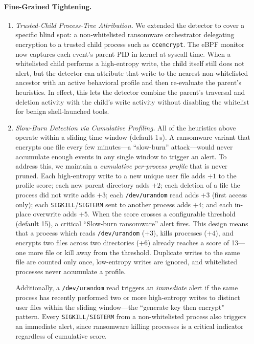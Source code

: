 \documentclass[twocolumn, 10pt]{scrartcl}
\begin{document}
\paragraph{Fine-Grained Tightening.}
\begin{enumerate}
    \item \textit{Trusted-Child Process-Tree Attribution.}
    We extended the detector to cover a specific blind spot: a non-whitelisted ransomware orchestrator delegating encryption to a trusted child process such as \texttt{ccencrypt}. The eBPF monitor now captures each event's parent PID in-kernel at syscall time. When a whitelisted child performs a high-entropy write, the child itself still does not alert, but the detector can attribute that write to the nearest non-whitelisted ancestor with an active behavioral profile and then re-evaluate the parent's heuristics. In effect, this lets the detector combine the parent's traversal and deletion activity with the child's write activity without disabling the whitelist for benign shell-launched tools.

    \item \textit{Slow-Burn Detection via Cumulative Profiling.}
    All of the heuristics above operate within a sliding time window (default 1\,s). A ransomware variant that encrypts one file every few minutes---a ``slow-burn'' attack---would never accumulate enough events in any single window to trigger an alert. To address this, we maintain a \emph{cumulative per-process profile} that is never pruned. Each high-entropy write to a new unique user file adds $+1$ to the profile score; each new parent directory adds $+2$; each deletion of a file the process did not write adds $+3$; each \texttt{/dev/urandom} read adds $+3$ (first access only); each \texttt{SIGKILL}/\texttt{SIGTERM} sent to another process adds $+4$; and each in-place overwrite adds $+5$. When the score crosses a configurable threshold (default 15), a critical ``Slow-burn ransomware'' alert fires. This design means that a process which reads \texttt{/dev/urandom} ($+3$), kills processes ($+4$), and encrypts two files across two directories ($+6$) already reaches a score of 13---one more file or kill away from the threshold. Duplicate writes to the same file are counted only once, low-entropy writes are ignored, and whitelisted processes never accumulate a profile.
    
    Additionally, a \texttt{/dev/urandom} read triggers an \emph{immediate} alert if the same process has recently performed two or more high-entropy writes to distinct user files within the sliding window---the ``generate key then encrypt'' pattern. Every \texttt{SIGKILL}/\texttt{SIGTERM} from a non-whitelisted process also triggers an immediate alert, since ransomware killing processes is a critical indicator regardless of cumulative score.

\end{enumerate}
\end{document}

